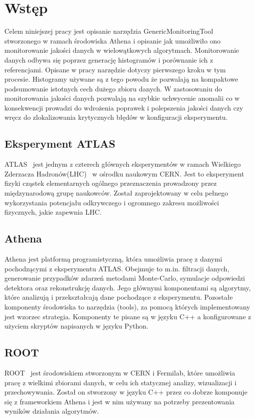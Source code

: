 \section{Wstęp}
Celem niniejszej pracy jest opisanie narzędzia \mbox{GenericMonitoringTool} stworzonego w ramach środowiska Athena\cite{Athena} i opisanie jak umożliwiło ono monitorowanie jakości danych w wielowątkowych algorytmach. 
Monitorowanie danych odbywa się poprzez generację histogramów i porównanie ich z referencjami. Opisane w pracy narzędzie dotyczy pierwszego kroku w tym procesie.
Histogramy używane są z tego powodu że pozwalają na kompaktowe podsumowanie istotnych cech dużego zbioru danych. 
W zastosowaniu do monitorowania jakości danych pozwalają na szybkie uchwycenie anomalii co w konsekwencji prowadzi do wdrożenia poprawek i polepszenia jakości danych czy wręcz do zlokalizowania krytycznych błędów w konfiguracji eksperymentu. 

\subsection{Eksperyment ATLAS} 
ATLAS~\cite{} jest jednym z czterech głównych eksperymentów w ramach Wielkiego Zderzacza Hadronów(LHC)~\cite{} w ośrodku naukowym CERN. Jest to eksperyment fizyki cząstek elementarnych ogólnego przeznaczenia prowadzony przez międzynarodową grupę naukowców. Został zaprojektowany w celu pełnego wykorzystania potencjału odkrywczego i ogromnego zakresu możliwości fizycznych, jakie zapewnia LHC.

\subsection{Athena} 
Athena jest platformą programistyczną, która umożliwia pracę z danymi pochodzącymi z eksperymentu ATLAS. Obejmuje to m.in. filtracji danych, generowanie przypadków zdarzeń metodami Monte-Carlo, symulacje odpowiedzi detektora oraz rekonstrukcję danych. Jego głównymi komponentami są algorytmy, które analizują i przekształcają dane pochodzące z eksperymentu. Pozostałe komponenty środowiska to narzędzia (tools), za pomocą których implementowany jest wzorzec strategia.  Komponenty te pisane są w języku C++ a konfigurowane z użyciem skryptów napisanych w języku Python. 

\subsection{ROOT} 
ROOT~\cite{} jest środowiskiem stworzonym w CERN i Fermilab, które umożliwia pracę z wielkimi zbiorami danych, w celu ich statycznej analizy, wizualizacji i przechowywania. Został on stworzony w języku C++ przez co dobrze komponuje się z frameworkiem Athena i jest w nim używany na potrzeby prezentowania wyników działania algorytmów. 

